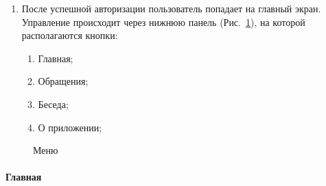 \documentclass{../includes/TechDoc}
\begin{document}
\begin{enumerate}
        \item После успешной авторизации пользователь попадает на главный экран.
        Управление происходит через нижнюю панель (Рис.~\ref{fig:menu}), на которой располагаются кнопки:
        \begin{enumerate}[noitemsep]
            \item Главная;
            \item Обращения;
            \item Беседа;
            \item О приложении;
        \end{enumerate}
    \end{enumerate}

    \begin{figure}[ht]
        \centering
        \caption{Меню}
        \label{fig:menu}
    \end{figure}

    \clearpage

    \paragraph{Главная}
\end{document}
